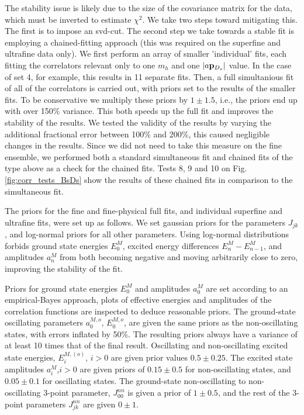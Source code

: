 The stability issue is likely due to the size of the covariance matrix for the data, which must be inverted to estimate $\chi^2$. We take two steps toward mitigating this. The first is to impose an svd-cut. The second step we take towards a stable fit is employing a chained-fitting approach (this was required on the superfine and ultrafine data only). We first perform an array of smaller 'individual' fits, each fitting the correlators relevant only to one $m_h$ and one $|a{\bf{p}}_{D_s}|$ value. In the case of set 4, for example, this results in 11 separate fits. Then, a full simultanious fit of all of the correlators is carried out, with priors set to the results of the smaller fits. To be conservative we multiply these priors by $1\pm 1.5$, i.e., the priors end up with over 150\% variance. This both speeds up the full fit and improves the stability of the results. We tested the validity of the results by varying the additional fractional error between 100\% and 200\%, this caused negligible changes in the results. Since we did not need to take this measure on the fine ensemble, we performed both a standard simultaneous fit and chained fits of the type above as a check for the chained fits. Tests 8, 9 and 10 on Fig. \ref{fig:corr_tests_BsDs} show the results of these chained fits in comparison to the simultaneous fit.

The priors for the fine and fine-physical full fits, and individual superfine and ultrafine fits, were set up as follows. We set gaussian priors for the parameters $J_{jk}$, and log-normal priors for all other parameters. Using log-normal distributions forbids ground state energies $E_0^M$, excited energy differences $E_n^M-E_{n-1}^M$, and amplitudes $a_n^M$ from both becoming negative and moving arbitrarily close to zero, improving the stability of the fit.

Priors for ground state energies $E_0^M$ and amplitudes $a_0^M$ are set according to an empirical-Bayes approach, plots of effective energies and amplitudes of the correlation functions are inspected to deduce reasonable priors. The ground-state oscillating parameters $a_0^{M,o}$, $E_0^{M,o}$, are given the same priors as the non-oscillating states, with errors inflated by 50\%. The resulting priors always have a variance of at least 10 times that of the final result. Oscillating and non-oscillating excited state energies, $E_i^{M,(o)}$, $i>0$ are given prior values $0.5\pm 0.25$. The excited state amplitudes $a_i^M$,$i>0$ are given priors of $0.15\pm 0.5$ for non-oscillating states, and $0.05\pm0.1$ for oscillating states. The ground-state non-oscillating to non-oscillating 3-point parameter, $J_{00}^{nn}$ is given a prior of $1\pm 0.5$, and the rest of the 3-point parameters $J_{jk}^{nn}$ are given $0\pm 1$.

